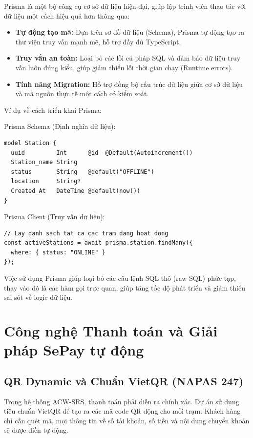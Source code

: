 \documentclass[../main.tex]{subfiles}
\begin{document}
Prisma là một bộ công cụ cơ sở dữ liệu hiện đại, giúp lập trình viên thao tác với dữ liệu một cách hiệu quả hơn thông qua:
\begin{itemize}
    \item \textbf{Tự động tạo mã:} Dựa trên sơ đồ dữ liệu (Schema), Prisma tự động tạo ra thư viện truy vấn mạnh mẽ, hỗ trợ đầy đủ TypeScript.
    \item \textbf{Truy vấn an toàn:} Loại bỏ các lỗi cú pháp SQL và đảm bảo dữ liệu truy vấn luôn đúng kiểu, giúp giảm thiểu lỗi thời gian chạy (Runtime errors).
    \item \textbf{Tính năng Migration:} Hỗ trợ đồng bộ cấu trúc dữ liệu giữa cơ sở dữ liệu và mã nguồn thực tế một cách có kiểm soát.
\end{itemize}

Ví dụ về cách triển khai Prisma:

Prisma Schema (Định nghĩa dữ liệu):
\begin{Verbatim}
model Station {
  uuid         Int      @id  @Default(Autoincrement())
  Station_name String
  status       String   @default("OFFLINE")
  location     String?
  Created_At   DateTime @default(now())
}
\end{Verbatim}

Prisma Client (Truy vấn dữ liệu):
\begin{Verbatim}
// Lay danh sach tat ca cac tram dang hoat dong
const activeStations = await prisma.station.findMany({
  where: { status: "ONLINE" }
});
\end{Verbatim}

Việc sử dụng Prisma giúp loại bỏ các câu lệnh SQL thô (raw SQL) phức tạp, thay vào đó là các hàm gọi trực quan, giúp tăng tốc độ phát triển và giảm thiểu sai sót về logic dữ liệu.

\section{Công nghệ Thanh toán và Giải pháp SePay tự động}

\subsection{QR Dynamic và Chuẩn VietQR (NAPAS 247)}

Trong hệ thống ACW-SRS, thanh toán phải diễn ra chính xác. Dự án sử dụng tiêu chuẩn VietQR để tạo ra các mã code QR động cho mỗi trạm. Khách hàng chỉ cần quét mã, mọi thông tin về số tài khoản, số tiền và nội dung chuyển khoản sẽ được điền tự động.
\end{document}
